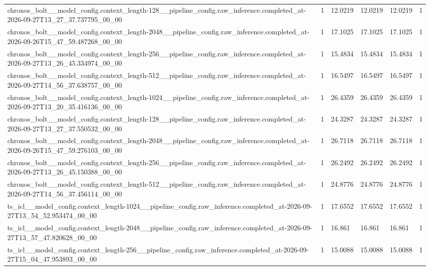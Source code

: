 \begin{tabular}{llllll}
chronos\_bolt\_\_model\_config.context\_length-128\_\_pipeline\_config.raw\_inference.completed\_at-2026-09-27T13\_27\_37.737795\_00\_00 & 1 & 12.0219 & 12.0219 & 12.0219 & 1 \\
chronos\_bolt\_\_model\_config.context\_length-2048\_\_pipeline\_config.raw\_inference.completed\_at-2026-09-26T15\_47\_59.487268\_00\_00 & 1 & 17.1025 & 17.1025 & 17.1025 & 1 \\
chronos\_bolt\_\_model\_config.context\_length-256\_\_pipeline\_config.raw\_inference.completed\_at-2026-09-27T13\_26\_45.334974\_00\_00 & 1 & 15.4834 & 15.4834 & 15.4834 & 1 \\
chronos\_bolt\_\_model\_config.context\_length-512\_\_pipeline\_config.raw\_inference.completed\_at-2026-09-27T14\_56\_37.638757\_00\_00 & 1 & 16.5497 & 16.5497 & 16.5497 & 1 \\
chronos\_bolt\_\_model\_config.context\_length-1024\_\_pipeline\_config.raw\_inference.completed\_at-2026-09-27T13\_20\_35.416136\_00\_00 & 1 & 26.4359 & 26.4359 & 26.4359 & 1 \\
chronos\_bolt\_\_model\_config.context\_length-128\_\_pipeline\_config.raw\_inference.completed\_at-2026-09-27T13\_27\_37.550532\_00\_00 & 1 & 24.3287 & 24.3287 & 24.3287 & 1 \\
chronos\_bolt\_\_model\_config.context\_length-2048\_\_pipeline\_config.raw\_inference.completed\_at-2026-09-26T15\_47\_59.276103\_00\_00 & 1 & 26.7118 & 26.7118 & 26.7118 & 1 \\
chronos\_bolt\_\_model\_config.context\_length-256\_\_pipeline\_config.raw\_inference.completed\_at-2026-09-27T13\_26\_45.150388\_00\_00 & 1 & 26.2492 & 26.2492 & 26.2492 & 1 \\
chronos\_bolt\_\_model\_config.context\_length-512\_\_pipeline\_config.raw\_inference.completed\_at-2026-09-27T14\_56\_37.456114\_00\_00 & 1 & 24.8776 & 24.8776 & 24.8776 & 1 \\
ts\_icl\_\_model\_config.context\_length-1024\_\_pipeline\_config.raw\_inference.completed\_at-2026-09-27T13\_54\_52.953474\_00\_00 & 1 & 17.6552 & 17.6552 & 17.6552 & 1 \\
ts\_icl\_\_model\_config.context\_length-2048\_\_pipeline\_config.raw\_inference.completed\_at-2026-09-27T13\_57\_47.820628\_00\_00 & 1 & 16.861 & 16.861 & 16.861 & 1 \\
ts\_icl\_\_model\_config.context\_length-256\_\_pipeline\_config.raw\_inference.completed\_at-2026-09-27T15\_04\_47.953893\_00\_00 & 1 & 15.0088 & 15.0088 & 15.0088 & 1 \\

\end{tabular}
